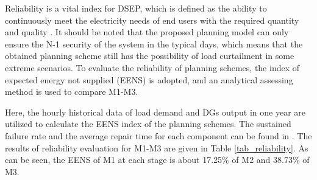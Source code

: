 \documentclass[a4paper,fleqn]{cas-dc}
\begin{document}
{Reliability is a vital index for DSEP, which is defined as the ability to 
continuously meet the electricity needs of end users with the required quantity 
and quality \cite{Muñoz-Delgado_2018_Distribution}. It should be noted that the 
proposed planning model can only ensure the N-1 security of the system in the 
typical days, which means that the obtained planning scheme still has the 
possibility of load curtailment in some extreme scenarios. To evaluate the 
reliability of planning schemes, the index of expected energy not supplied 
(EENS) is adopted, and an analytical assessing method 
\cite{Zou_2014_An_Analytical} is used to compare M1-M3. 

Here, the hourly historical data of load demand and DGs output in one year are 
utilized to calculate the EENS index of the planning schemes. The sustained 
failure rate and the average repair time for each component can be found in 
\cite{Zou_2014_An_Analytical}. The results of reliability evaluation for M1-M3 
are given in Table \ref{tab_reliability}. As can be seen, the EENS 
of M1 at each stage is about 17.25\% of M2 and 38.73\% of M3.

}
\end{document}
